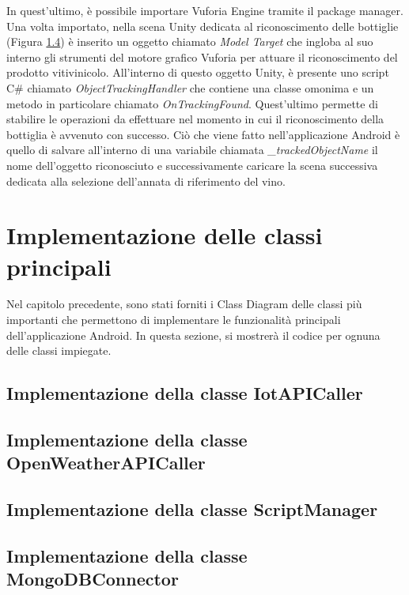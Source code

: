 In quest'ultimo, è possibile importare Vuforia Engine tramite il package manager. Una volta importato, nella scena Unity dedicata al riconoscimento delle bottiglie (Figura \ref{})
è inserito un oggetto chiamato \textit{Model Target} che ingloba al suo interno gli strumenti del motore grafico Vuforia per attuare il riconoscimento del prodotto vitivinicolo. 
All'interno di questo oggetto Unity, è presente uno script C\# chiamato \textit{ObjectTrackingHandler} che contiene una classe omonima e un metodo in particolare chiamato \textit{OnTrackingFound}. Quest'ultimo permette di stabilire le operazioni da effettuare nel momento in cui il riconoscimento della bottiglia è avvenuto con successo. Ciò che viene fatto nell'applicazione Android è quello di salvare all'interno di una variabile chiamata \textit{\_trackedObjectName} il nome dell'oggetto riconosciuto e successivamente caricare la scena successiva dedicata alla selezione dell'annata di riferimento del vino.


\section{Implementazione delle classi principali}

Nel capitolo precedente, sono stati forniti i Class Diagram delle classi più importanti che permettono di implementare le funzionalità principali dell'applicazione Android. In questa sezione, si mostrerà il codice per ognuna delle classi impiegate.

\subsection{Implementazione della classe IotAPICaller}



\subsection{Implementazione della classe OpenWeatherAPICaller}



\subsection{Implementazione della classe ScriptManager}



\subsection{Implementazione della classe MongoDBConnector}



